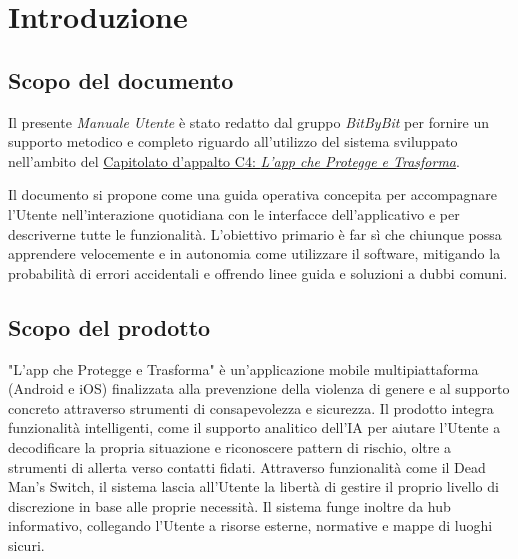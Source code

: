 \documentclass[a4paper,12pt]{article}
\newcommand{\ignoreglossary}{}
\begin{document}
\clearpage
\tableofcontents
\thispagestyle{empty}
\clearpage

\listoffigures
\clearpage


\section{Introduzione} \label{sec:introduzione}

\subsection{Scopo del documento} \label{sec:scopo_documento}
Il presente \textit{Manuale \ignoreglossary{Utente}} è stato redatto dal gruppo \textit{BitByBit} per fornire un supporto metodico e completo riguardo all'utilizzo del sistema sviluppato nell'ambito del \href{https://www.math.unipd.it/~tullio/IS-1/2025/Progetto/C4.pdf}{Capitolato d'appalto C4: \emph{L'app che Protegge e Trasforma}}.

Il documento si propone come una guida operativa concepita per accompagnare l'Utente nell'interazione quotidiana con le interfacce dell'applicativo e per descriverne tutte le funzionalità. L'obiettivo primario è far sì che chiunque possa apprendere velocemente e in autonomia come utilizzare il software, mitigando la probabilità di errori accidentali e offrendo linee guida e soluzioni a dubbi comuni.

\subsection{Scopo del prodotto} \label{sec:scopo_prodotto}
"L'app che Protegge e Trasforma" è un'applicazione mobile multipiattaforma (Android e iOS) finalizzata alla prevenzione della violenza di genere e al supporto concreto attraverso strumenti di consapevolezza e sicurezza. Il prodotto integra funzionalità intelligenti, come il supporto analitico dell'IA per aiutare l'Utente a decodificare la propria situazione e riconoscere pattern di rischio, oltre a strumenti di allerta verso contatti fidati. Attraverso funzionalità come il Dead Man's Switch, il sistema lascia all'Utente la libertà di gestire il proprio livello di discrezione in base alle proprie necessità. Il sistema funge inoltre da hub informativo, collegando l'Utente a risorse esterne, normative e mappe di luoghi sicuri.
\end{document}

